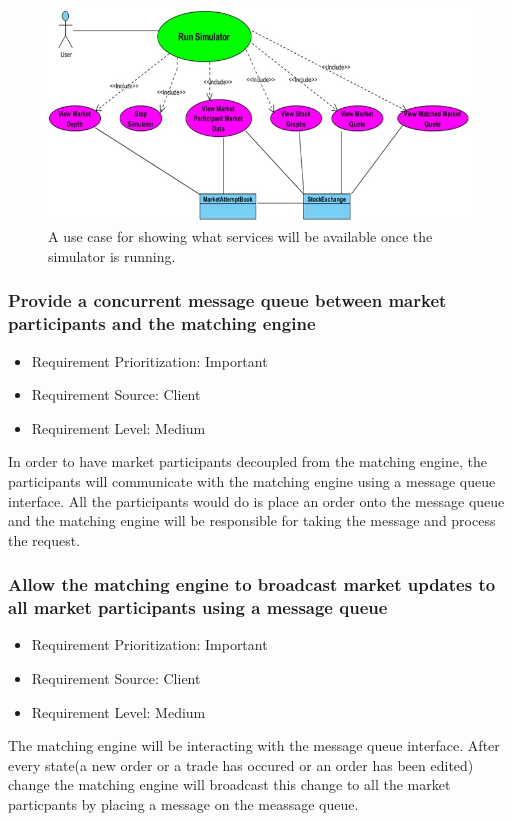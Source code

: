 \documentclass[12pt]{article}
\begin{document}
			\begin{figure}[th!]
			\centering
			\includegraphics[scale=0.8]{./USE_CASE_Run_Simulator_Financial_Market_Simulator}
			\caption{A use case for showing what services will be available once the simulator is running.}
			\label{domain objects}
			\end{figure}
	
			\subsubsection{Provide a concurrent message queue between market participants and the matching engine}
			\begin{itemize}
				\item Requirement Prioritization: Important
				\item Requirement Source: Client 
				\item Requirement Level: Medium	
			\end{itemize}
			In order to have market participants decoupled from the matching engine,  the participants will communicate with the matching engine using a message queue interface. All the participants would do is place an order onto the message queue and the matching engine will be responsible for taking the message and process the request.
			
			\subsubsection{Allow the matching engine to broadcast market updates to all market participants using a message queue}
			\begin{itemize}
				\item Requirement Prioritization: Important
				\item Requirement Source: Client 
				\item Requirement Level: Medium	
			\end{itemize}
			The matching engine will be interacting with the message queue interface. After every state(a new order or a trade has occured or an order has been edited) change the matching engine will broadcast this change to all the market particpants by placing a message on the meassage queue.
			
\end{document}
